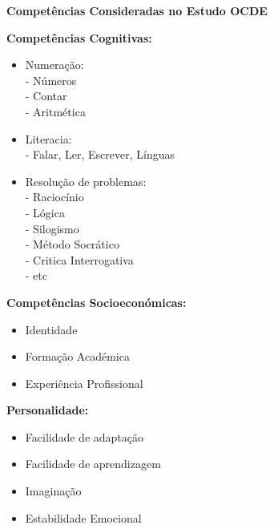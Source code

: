 \begin{center}\textbf{\large Competências Consideradas no Estudo OCDE} %
\end{center}
\begin{minipage}[t]{.5\linewidth}
\qquad \textbf{Competências Cognitivas:}
\begin{itemize}
\item Numeração:\\
- Números\\
- Contar\\
- Aritmética
\item Literacia:\\
- Falar, Ler, Escrever, Línguas
\item Resolução de problemas:\\
- Raciocínio\\
- Lógica\\
- Silogismo\\
- Método Socrático\\
- Critica Interrogativa\\
- etc
\end{itemize}
\qquad \textbf{Competências Socioeconómicas:}
\begin{itemize}
\setlength\itemsep{-1em}
\item Identidade\\
\item Formação Académica\\
\item Experiência Profissional
\end{itemize}
\qquad \textbf{Personalidade:}
\begin{itemize}
\setlength\itemsep{-1em}
\item Facilidade de adaptação\\
\item Facilidade de aprendizagem\\
\item Imaginação \\
\item Estabilidade Emocional
\end{itemize}
\end{minipage}
